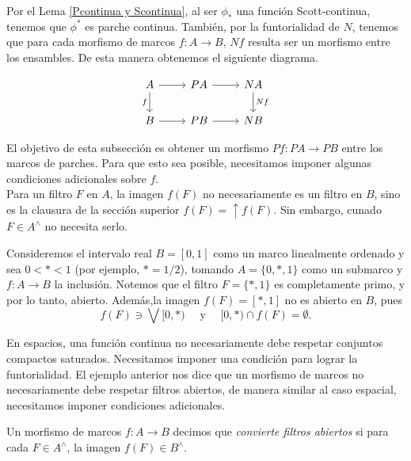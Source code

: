 Por el Lema \ref{Pcontinua y Scontinua}, al ser $\phi_*$ una función Scott-continua, tenemos que $\phi^*$ es parche continua. También, por la funtorialidad de $N$, tenemos que para cada morfismo de marcos $f\colon A\to B$, $Nf$ resulta ser un morfismo entre los ensambles. De esta manera obtenemos el siguiente diagrama.

\[\begin{tikzcd}
	A & PA & NA \\
	B & PB & NB
	\arrow[from=1-1, to=1-2]
	\arrow["f"', from=1-1, to=2-1]
	\arrow[from=1-2, to=1-3]
	\arrow["Nf", from=1-3, to=2-3]
	\arrow[from=2-1, to=2-2]
	\arrow[from=2-2, to=2-3]
\end{tikzcd}\]

El objetivo de esta subsección es obtener un morfismo $Pf\colon PA\to PB$ entre los marcos de parches. Para que esto sea posible, necesitamos imponer algunas condiciones adicionales sobre $f$.\\

Para un filtro $F$ en $A$, la imagen $f(F)$ no necesariamente es un filtro en $B$, sino es la clausura de la sección superior $f(F)=\uparrow f(F)$. Sin embargo, cunado $F\in A^\wedge$ no necesita serlo.

\begin{ej}\label{Ejemplo7.2.1}
    Consideremos el intervalo real $B=[0,1]$ como un marco linealmente ordenado y sea $0< * < 1$ (por ejemplo, $*=1/2$), tomando $A=\{0, *, 1\}$ como un submarco y $f\colon A\to B$ la inclusión. Notemos que el filtro $F=\{*, 1\}$ es completamente primo, y por lo tanto, abierto. Además,la imagen $f(F)=[*, 1]$ no es abierto en $B$, pues 
    \[
    f(F)\ni \bigvee [0, *)\quad \mbox{ y }\quad[0, *)\cap f(F)=\emptyset.
    \]
\end{ej}

En espacios, una función continua no necesariamente debe respetar conjuntos compactos saturados. Necesitamos imponer una condición para lograr la funtorialidad. El ejemplo anterior nos dice que un morfismo de marcos no necesariamente debe respetar filtros abiertos, de manera similar al caso espacial, necesitamos imponer condiciones adicionales.\\

\begin{dfn}\label{Definicion7.2.2}
    Un morfismo de marcos $f\colon A\to B$ decimos que \emph{convierte filtros abiertos} si para cada $F\in A^\wedge$, la imagen $f(F)\in B^\wedge$.
\end{dfn}

